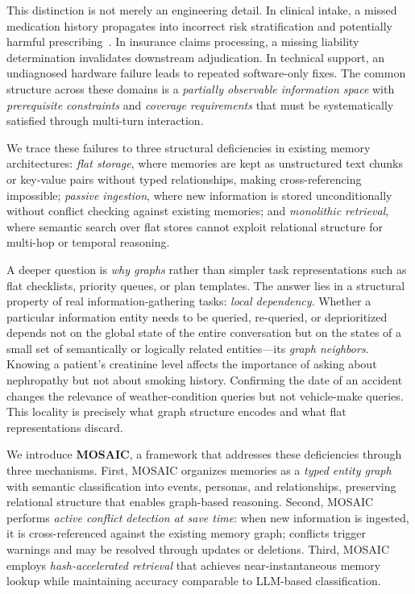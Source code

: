 \documentclass[10pt,twocolumn]{article}
\begin{document}
This distinction is not merely an engineering detail. In clinical intake, a
missed medication history propagates into incorrect risk stratification and
potentially harmful prescribing~\citep{singhal2023large}. In insurance
claims processing, a missing liability determination invalidates downstream
adjudication. In technical support, an undiagnosed hardware failure leads to
repeated software-only fixes. The common structure across these domains is a
\emph{partially observable information space} with \emph{prerequisite
constraints} and \emph{coverage requirements} that must be systematically
satisfied through multi-turn interaction.

We trace these failures to three structural deficiencies in existing memory
architectures: \emph{flat storage}, where memories are kept as unstructured
text chunks or key-value pairs without typed relationships, making
cross-referencing impossible; \emph{passive ingestion}, where new information
is stored unconditionally without conflict checking against existing
memories; and \emph{monolithic retrieval}, where semantic search over flat
stores cannot exploit relational structure for multi-hop or temporal
reasoning.

A deeper question is \emph{why graphs} rather than simpler task
representations such as flat checklists, priority queues, or plan templates.
The answer lies in a structural property of real information-gathering tasks:
\emph{local dependency}. Whether a particular information entity needs to be
queried, re-queried, or deprioritized depends not on the global state of
the entire conversation but on the states of a small set of semantically
or logically related entities---its \emph{graph neighbors}. Knowing a
patient's creatinine level affects the importance of asking about nephropathy
but not about smoking history. Confirming the date of an accident changes the
relevance of weather-condition queries but not vehicle-make queries. This
locality is precisely what graph structure encodes and what flat
representations discard.

We introduce \textbf{MOSAIC}, a framework that addresses these deficiencies
through three mechanisms. First, MOSAIC organizes memories as a \emph{typed
entity graph} with semantic classification into events, personas, and
relationships, preserving relational structure that enables graph-based
reasoning. Second, MOSAIC performs \emph{active conflict detection at save
time}: when new information is ingested, it is cross-referenced against the
existing memory graph; conflicts trigger warnings and may be resolved through
updates or deletions. Third, MOSAIC employs \emph{hash-accelerated retrieval}
that achieves near-instantaneous memory lookup while maintaining accuracy
comparable to LLM-based classification.
\end{document}
